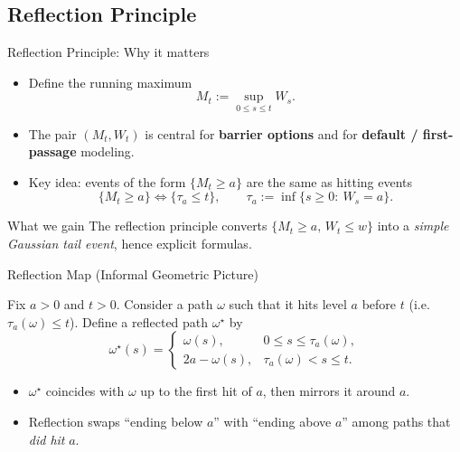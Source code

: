 \documentclass[10pt,aspectratio=169]{beamer}
\begin{document}
\subsection{Reflection Principle}

\begin{frame}{Reflection Principle: Why it matters}

\begin{itemize}
  \item Define the running maximum
  \[
  M_t := \sup_{0\le s\le t} W_s .
  \]
  \item The pair \((M_t,W_t)\) is central for \textbf{barrier options} and for \textbf{default / first-passage} modeling. 
  \item Key idea: events of the form \(\{M_t\ge a\}\) are the same as hitting events
  \[
  \{M_t\ge a\} \iff \{\tau_a \le t\},
  \qquad
  \tau_a := \inf\{s\ge 0:\ W_s=a\}. 
  \]
\end{itemize}

\medskip
\begin{block}{What we gain}
The reflection principle converts \(\{M_t\ge a,\,W_t\le w\}\) into a \emph{simple Gaussian tail event},
hence explicit formulas.
\end{block}

\end{frame}



\begin{frame}{Reflection Map (Informal Geometric Picture)}

Fix \(a>0\) and \(t>0\). Consider a path \(\omega\) such that it hits level \(a\) before \(t\)
(i.e. \(\tau_a(\omega)\le t\)). Define a reflected path \(\omega^\star\) by
\[
\omega^\star(s)=
\begin{cases}
\omega(s), & 0\le s\le \tau_a(\omega),\\
2a-\omega(s), & \tau_a(\omega) < s\le t.
\end{cases}
\]
\medskip

\begin{itemize}
  \item \(\omega^\star\) coincides with \(\omega\) up to the first hit of \(a\), then mirrors it around \(a\).
  \item Reflection swaps “ending below \(a\)” with “ending above \(a\)” among paths that \emph{did hit} \(a\).
\end{itemize}


\end{frame}
\end{document}
